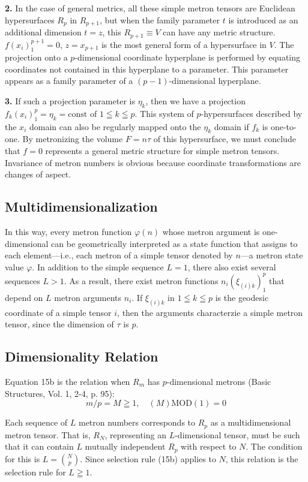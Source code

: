\documentclass[11pt,a4paper,oneside]{article}
\begin{document}
\textbf{2.} In the case of general metrics, all these simple metron tensors are Euclidean hypersurfaces $R_p$ in $R_{p + 1}$, but when the family parameter $t$ is introduced as an additional dimension $t = z$, this $R_{p + 1} \equiv V$ can have any metric structure. $f(x_i)_1^{p + 1} = 0$, $z = x_{p + 1}$ is the most general form of a hypersurface in $V$.
The projection onto a $p$-dimensional coordinate hyperplane is performed by equating coordinates not contained in this hyperplane to a parameter. This parameter appears as a family parameter of a $(p-1)$-dimensional hyperplane.

\textbf{3.} If such a projection parameter is $\eta_k$, then we have a projection $f_k(x_i)^p_1 = \eta_k = \text{const}$ of $1 \leqq k \leqq p$. This system of $p$-hypersurfaces described by the $x_i$ domain can also be regularly mapped onto the $\eta_k$ domain if $f_k$ is one-to-one. By metronizing the volume $F = n \tau$ of this hypersurface, we must conclude that $f = 0$ represents a general metric structure for simple metron tensors.
Invariance of metron numbers is obvious because coordinate transformations are changes of aspect.

\subsection{Multidimensionalization}
In this way, every metron function $\varphi(n)$ whose metron argument is one-dimensional can be geometrically interpreted as a state function that assigns to each element—i.e., each metron of a simple tensor denoted by $n$—a metron state value $\varphi$. In addition to the simple sequence $L = 1$, there also exist several sequences $L > 1$. As a result, there exist metron functions $n_i(\xi_{(i) k})^p_1$ that depend on $L$ metron arguments $n_i$. If $\xi_{(i)k}$ in $1 \leqq k \leqq p$ is the geodesic coordinate of a simple tensor $i$, then the arguments characterzie a simple metron tensor, since the dimension of $\tau$ is $p$.

\subsection{Dimensionality Relation}
Equation 15b is the relation when $R_m$ has $p$-dimensional metrons (Basic Structures, Vol. 1, 2-4, p. 95):
\begin{equation}
    m/p = M \geqq 1,\quad (M) \text{MOD}(1) = 0 \tag{15b}
\end{equation}

Each sequence of $L$ metron numbers corresponds to $R_p$ as a multidimensional metron tensor. That is, $R_N$, representing an $L$-dimensional tensor, must be such that it can contain $L$ mutually independent $R_p$ with respect to $N$. The condition for this is $L = \binom {N}{p}$. Since selection rule (15b) applies to $N$, this relation is the selection rule for $L \geqq 1$.
\end{document}
